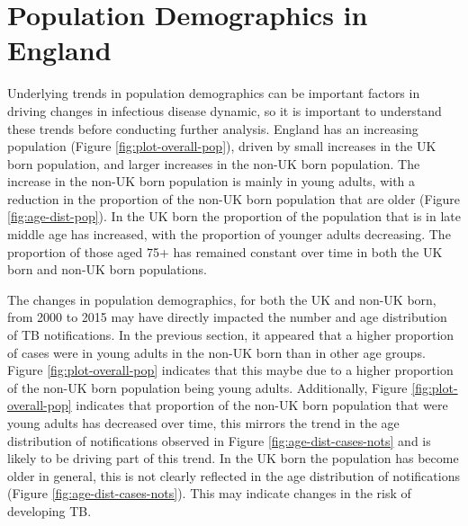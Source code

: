 \documentclass[11pt,twoside]{bristolthesis}
\begin{document}
  \hypertarget{pop-dist-england}{%
  \section{Population Demographics in England}\label{pop-dist-england}}
  
  Underlying trends in population demographics can be important factors in driving changes in infectious disease dynamic, so it is important to understand these trends before conducting further analysis. England has an increasing population (Figure \ref{fig:plot-overall-pop}), driven by small increases in the UK born population, and larger increases in the non-UK born population. The increase in the non-UK born population is mainly in young adults, with a reduction in the proportion of the non-UK born population that are older (Figure \ref{fig:age-dist-pop}). In the UK born the proportion of the population that is in late middle age has increased, with the proportion of younger adults decreasing. The proportion of those aged 75+ has remained constant over time in both the UK born and non-UK born populations.
  
  The changes in population demographics, for both the UK and non-UK born, from 2000 to 2015 may have directly impacted the number and age distribution of TB notifications. In the previous section, it appeared that a higher proportion of cases were in young adults in the non-UK born than in other age groups. Figure \ref{fig:plot-overall-pop} indicates that this maybe due to a higher proportion of the non-UK born population being young adults. Additionally, Figure \ref{fig:plot-overall-pop} indicates that proportion of the non-UK born population that were young adults has decreased over time, this mirrors the trend in the age distribution of notifications observed in Figure \ref{fig:age-dist-cases-nots} and is likely to be driving part of this trend. In the UK born the population has become older in general, this is not clearly reflected in the age distribution of notifications (Figure \ref{fig:age-dist-cases-nots}). This may indicate changes in the risk of developing TB.
  
\end{document}
